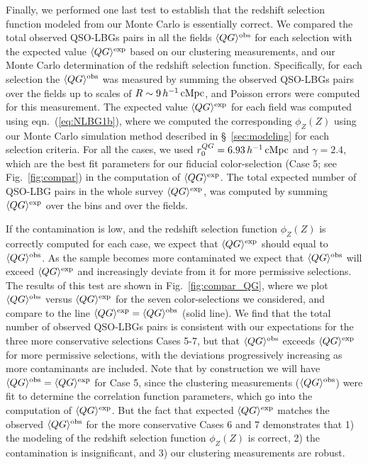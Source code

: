 \documentclass[iop, revtex4]{emulateapj}
\begin{document}
Finally, we performed one last test to establish that the
  redshift selection function modeled from our Monte Carlo is essentially correct. 
We compared the total observed QSO-LBGs pairs in all the fields
$\langle QG\rangle^{\rm obs}$ for each selection with the
expected value $\langle QG\rangle^{\rm exp}$ based on our
clustering measurements, and our Monte Carlo determination of the
redshift selection function.  Specifically, for each selection the
$\langle QG\rangle^{\rm obs}$ was measured by
summing the observed QSO-LBGs pairs over the fields up to scales of
$R\sim 9\,h^{-1}\,{\rm cMpc}$, and Poisson errors were computed for
this measurement.  The expected value $\langle QG\rangle^{\rm exp}$
for each field
was computed
using eqn.~(\ref{eq:NLBG1b}), where we computed the corresponding
$\phi_{Z}(Z)$ using our Monte Carlo simulation method described in
\S~\ref{sec:modeling} for each selection criteria. For all the cases,
we used $r^{QG}_{0}=6.93\,h^{-1}\,{\rm cMpc}$ and $\gamma=2.4$,
which are the best fit parameters for our fiducial
color-selection (Case 5; see Fig.~\ref{fig:compar}) in the computation of
$\langle QG\rangle^{\rm exp}$.
The total expected number of QSO-LBG pairs in the whole survey $\langle QG\rangle^{\rm exp}$, was
computed by summing $\langle QG\rangle^{\rm exp}$ over the bins and over the fields.

If the contamination is low,  and the redshift
selection function $\phi_{Z}(Z)$ is correctly computed for each case, we
expect that $\langle QG\rangle^{\rm exp}$ should equal to
$\langle QG\rangle^{\rm obs}$. As the sample becomes more
contaminated we expect that $\langle QG\rangle^{\rm obs}$
will exceed $\langle QG\rangle^{\rm exp}$ and 
increasingly deviate from it for more permissive selections.
The results of this test are shown in Fig.~\ref{fig:compar_QG}, where we plot
$\langle QG\rangle^{\rm obs}$ versus $\langle QG\rangle^{\rm exp}$
for the seven color-selections we considered, and compare to the line 
$\langle QG\rangle^{\rm exp}=\langle QG\rangle^{\rm obs}$ (solid line). 
We find that the
total number of observed QSO-LBGs pairs is consistent with our
expectations for the three
more conservative selections Cases 5-7, but that $\langle
QG\rangle^{\rm obs}$ exceeds $\langle QG\rangle^{\rm exp}$ for more permissive selections, with the
deviations progressively increasing as more contaminants are
included. Note that by construction we will have $\langle
QG\rangle^{\rm obs}=\langle QG\rangle^{\rm
  exp}$ for Case 5, since the clustering measurements ($\langle
QG\rangle^{\rm obs}$) were fit to determine
the correlation function parameters, which go into the
computation of $\langle QG\rangle^{\rm exp}$. But the
fact that expected $\langle QG\rangle^{\rm exp}$ matches
the observed $\langle QG\rangle^{\rm obs}$ for the more conservative Cases 6 and 7
demonstrates that 1) the modeling of the redshift selection function
$\phi_{Z}(Z)$ is correct, 
 2) the contamination is insignificant, 
 and 3) our clustering measurements are robust.
\end{document}
